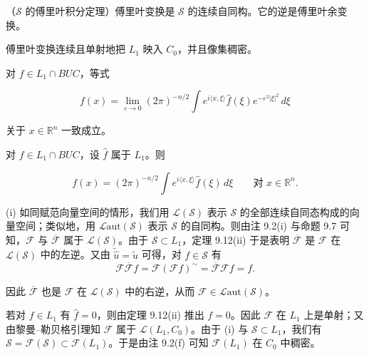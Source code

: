 \begin{corollary}

\begin{subitems}
\item

（$ \mathcal{S} $ 的傅里叶积分定理）傅里叶变换是 $ \mathcal{S} $ 的连续自同构。它的逆是傅里叶余变换。

\item

傅里叶变换连续且单射地把 $ L_1 $ 映入 $ C_0 $，并且像集稠密。

\item

对 $ f \in L_1\cap BUC $，等式

\[
f(x) = \lim_{\varepsilon\to0}(2\pi)^{-n/2}\int e^{i\langle x,\xi\rangle}\widehat{f}(\xi)e^{-\varepsilon^2|\xi|^2}\,d\xi
\]

关于 $ x \in \mathbb{R}^n $ 一致成立。

\item

对 $ f \in L_1\cap BUC $，设 $ \widehat{f} $ 属于 $ L_1 $。则

\[
f(x) = (2\pi)^{-n/2}\int e^{i\langle x,\xi\rangle}\widehat{f}(\xi)\,d\xi \qquad \text{对 } x \in \mathbb{R}^n .
\]

\proofhead
(i) 如同赋范向量空间的情形，我们用 $ \mathcal{L}(\mathcal{S}) $ 表示 $ \mathcal{S} $ 的全部连续自同态构成的向量空间；类似地，用 $ \mathcal{L}\mathrm{aut}(\mathcal{S}) $ 表示 $ \mathcal{S} $ 的自同构。则由注 9.2(i) 与命题 9.7 可知，$ \mathcal{F} $ 与 $ \overline{\mathcal{F}} $ 属于 $ \mathcal{L}(\mathcal{S}) $。由于 $ \mathcal{S} \subset L_1 $，定理 9.12(ii) 于是表明 $ \overline{\mathcal{F}} $ 是 $ \mathcal{F} $ 在 $ \mathcal{L}(\mathcal{S}) $ 中的左逆。又由 $ \widetilde{\widehat{u}} = \widehat{\widetilde{u}} $ 可得，对 $ f \in \mathcal{S} $ 有
\[
\mathcal{F}\overline{\mathcal{F}}f = \mathcal{F}(\mathcal{F}f)^{\sim} = \overline{\mathcal{F}}\mathcal{F}f = f .
\]

因此 $ \overline{\mathcal{F}} $ 也是 $ \mathcal{F} $ 在 $ \mathcal{L}(\mathcal{S}) $ 中的右逆，从而 $ \mathcal{F} \in \mathcal{L}\mathrm{aut}(\mathcal{S}) $。

\end{subitems}

\begin{subitems}
\item[（ii）]

若对 $ f \in L_1 $ 有 $ \widehat{f} = 0 $，则由定理 9.12(ii) 推出 $ f = 0 $。因此 $ \mathcal{F} $ 在 $ L_1 $ 上是单射；又由黎曼–勒贝格引理知 $ \mathcal{F} $ 属于 $ \mathcal{L}(L_1,C_0) $。由于 (i) 与 $ \mathcal{S} \subset L_1 $，我们有 $ \mathcal{S} = \mathcal{F}(\mathcal{S}) \subset \mathcal{F}(L_1) $。于是由注 9.2(f) 可知 $ \mathcal{F}(L_1) $ 在 $ C_0 $ 中稠密。


\end{subitems}
\end{corollary}

